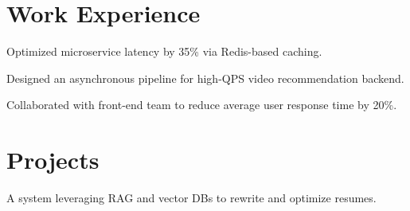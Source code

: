 \documentclass[]{plushcv}
\begin{document}
%
%

%
%

%
%

\begin{paracol}{2}
\setlength{\columnsep}{4mm}



\section{Work Experience}

\vspace{\topsep} %
 
\begin{tightemize}
	\item Optimized microservice latency by 35\% via Redis{-}based caching.
	\item Designed an asynchronous pipeline for high{-}QPS video recommendation backend.
	\item Collaborated with front{-}end team to reduce average user response time by 20\%.
\end{tightemize}
\sectionsep


\section{Projects}
 A system leveraging RAG and vector DBs to rewrite and optimize resumes. \sectionsep\\


%
%


\end{paracol}
\end{document}
